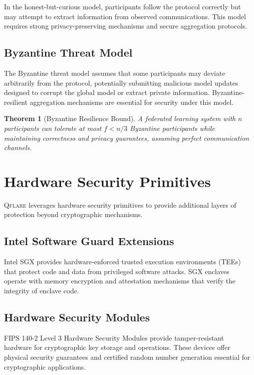 \documentclass[12pt,a4paper,twoside]{book}
\newcommand{\qflare}{\textsc{Qflare}}
\newtheorem{theorem}{Theorem}[chapter]
\begin{document}
In the honest-but-curious model, participants follow the protocol correctly but may attempt to extract information from observed communications. This model requires strong privacy-preserving mechanisms and secure aggregation protocols.

\subsection{Byzantine Threat Model}
\label{subsec:byzantine}

The Byzantine threat model assumes that some participants may deviate arbitrarily from the protocol, potentially submitting malicious model updates designed to corrupt the global model or extract private information. Byzantine-resilient aggregation mechanisms are essential for security under this model.

\begin{theorem}[Byzantine Resilience Bound]
\label{thm:byzantine-bound}
A federated learning system with $n$ participants can tolerate at most $f < n/3$ Byzantine participants while maintaining correctness and privacy guarantees, assuming perfect communication channels.
\end{theorem}

\section{Hardware Security Primitives}
\label{sec:hardware-security}

\qflare{} leverages hardware security primitives to provide additional layers of protection beyond cryptographic mechanisms.

\subsection{Intel Software Guard Extensions}
\label{subsec:sgx}

Intel SGX provides hardware-enforced trusted execution environments (TEEs) that protect code and data from privileged software attacks. SGX enclaves operate with memory encryption and attestation mechanisms that verify the integrity of enclave code.

\subsection{Hardware Security Modules}
\label{subsec:hsm}

FIPS 140-2 Level 3 Hardware Security Modules provide tamper-resistant hardware for cryptographic key storage and operations. These devices offer physical security guarantees and certified random number generation essential for cryptographic applications.
\end{document}
